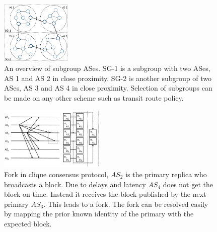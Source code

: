 \documentclass[conference]{IEEEtran}
\begin{document}
\begin{figure}[t]
\begin{center}
\includegraphics[width=0.30\textwidth]{fig/ASes_SG.pdf}
\caption{An overview of subgroup ASes. SG-1 is a subgroup with two ASes, AS 1 and AS 2 in close proximity. SG-2 is another subgroup of two ASes, AS 3 and AS 4 in close proximity. Selection of subgroups can be made on any other scheme such as transit route policy.} 
\label{fig:ASes_SG}
\end{center}
\end{figure}

\begin{figure}[t]
\begin{center}
\includegraphics[width=0.45\textwidth]{fig/bgp_clique.pdf}
\caption{Fork in clique consensus protocol, $AS_2$ is the primary replica who broadcasts a block. Due to delays and latency  $AS_4$ does not get the block on time. Instead it receives the block published by the next primary $AS_3$. This leads to a fork. The fork can be resolved easily by mapping the prior known identity of the primary with the expected block. } 
\label{fig:Clique_fork}
\end{center}
\end{figure}

\end{document}
